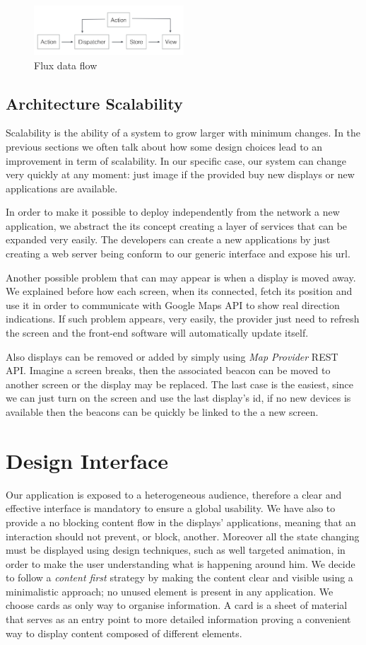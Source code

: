 \documentclass[]{usiinfbachelorproject}
\begin{document}
\begin{figure}[H]
  \centering
  \includegraphics[width=0.5\textwidth]{./images/flux_data_flow.png}
  \caption{Flux data flow}
\end{figure} 
\subsection{Architecture Scalability}
Scalability is the ability of a system to grow larger with minimum changes. In the previous sections we often talk about how some design choices lead to an improvement in term of scalability. In our specific case, our system can change very quickly at any moment: just image if the provided buy new displays or new applications are available.

In order to make it possible to deploy independently from the network a new application, we abstract the its concept creating a layer of services that can be expanded very easily. The developers can create a new applications by just creating a web server being conform to our generic interface and expose his url.

Another possible problem that can may appear is when a display is moved away. We explained before how each screen, when its connected, fetch its position and use it in order to communicate with Google Maps API to show real direction indications. If such problem appears, very easily, the provider just need to refresh the screen and the front-end software will automatically update itself.

Also displays can be removed or added by simply using \emph{Map Provider} REST API. Imagine a screen breaks, then the associated beacon can be moved to another screen or the display may be replaced. The last case is the easiest, since we can just turn on the screen and use the last display's id, if no new devices is available then the beacons can be quickly be linked to the a new screen.
\section{Design Interface}
Our application is exposed to a heterogeneous audience, therefore a clear and effective interface is mandatory to ensure a global usability. 
We have also to provide a no blocking content flow in the displays' applications, meaning that an interaction should not prevent, or block, another.
Moreover all the state changing must be displayed using design techniques, such as well targeted animation, in order to make the user understanding what is happening around him.
We decide to follow a \emph{content first} strategy by making the content clear and visible using a minimalistic approach; no unused element is present in any application. We choose cards as only way to organise information. A card is a sheet of material that serves as an entry point to more detailed information proving a convenient way to display content composed of different elements.
\end{document}
